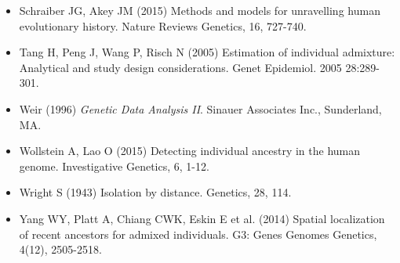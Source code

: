 \begin{itemize}
\item[] Schraiber JG, Akey JM (2015) Methods and models for unravelling human evolutionary history. Nature Reviews Genetics, 16, 727-740.

\item[] Tang H, Peng J, Wang P, Risch N (2005) Estimation of individual admixture: Analytical and study design considerations. Genet Epidemiol. 2005 28:289-301.

\item[] Weir (1996) {\it Genetic Data Analysis II}. Sinauer Associates Inc., Sunderland, MA.

\item[] Wollstein A, Lao O (2015) Detecting individual ancestry in the human genome. Investigative Genetics, 6, 1-12.

\item[] Wright S (1943) Isolation by distance. Genetics, 28, 114.

\item[] Yang WY, Platt A, Chiang CWK, Eskin E et al. (2014) Spatial localization of recent ancestors for admixed individuals. G3: Genes Genomes Genetics, 4(12), 2505-2518.


\end{itemize}
